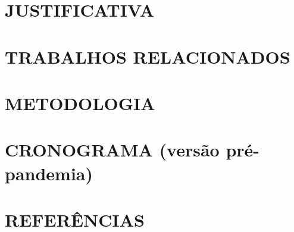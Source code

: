 \documentclass[12pt,a4paper]{article}
\begin{document}
    \section{JUSTIFICATIVA}

		

	\clearpage

	\section{TRABALHOS RELACIONADOS}

		

	\clearpage

	\section{METODOLOGIA}

		

	\clearpage

	\section{CRONOGRAMA (versão pré-pandemia)}

		

	\newpage
	\section*{REFERÊNCIAS}

		\printbibliography[heading=none]

		\newpage
\end{document}
